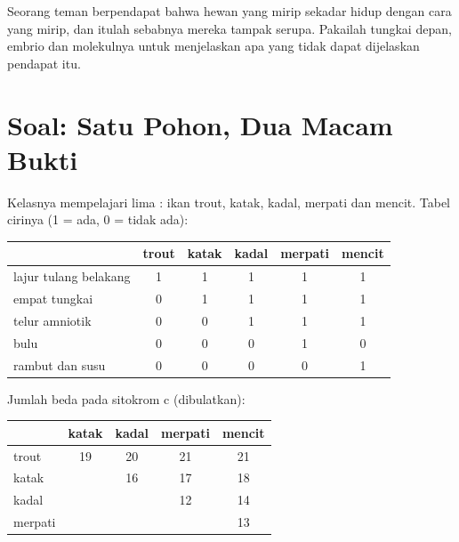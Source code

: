 \begin{exercise}[$\star\star\star$]\label{exo:g10:common-ancestry:15}
Seorang teman berpendapat bahwa hewan yang mirip sekadar hidup dengan
cara yang mirip, dan itulah sebabnya mereka tampak serupa. Pakailah
tungkai depan, embrio dan molekulnya untuk menjelaskan apa yang tidak
dapat dijelaskan pendapat itu.
\end{exercise}

\section{Soal: Satu Pohon, Dua Macam Bukti}

\begin{problem}
\label{pb:g10:common-ancestry:1}
Kelasnya mempelajari lima : ikan trout, katak, kadal, merpati
dan mencit. Tabel cirinya (1 = ada, 0 = tidak ada):

\begin{center}
\begin{tabular}{lccccc}
 & trout & katak & kadal & merpati & mencit \\ \hline
lajur tulang belakang & 1 & 1 & 1 & 1 & 1 \\
empat tungkai & 0 & 1 & 1 & 1 & 1 \\
telur amniotik & 0 & 0 & 1 & 1 & 1 \\
bulu & 0 & 0 & 0 & 1 & 0 \\
rambut dan susu & 0 & 0 & 0 & 0 & 1 \\
\end{tabular}
\end{center}

Jumlah beda pada sitokrom c (dibulatkan):

\begin{center}
\begin{tabular}{lcccc}
 & katak & kadal & merpati & mencit \\ \hline
trout & 19 & 20 & 21 & 21 \\
katak & & 16 & 17 & 18 \\
kadal & & & 12 & 14 \\
merpati & & & & 13 \\
\end{tabular}
\end{center}


\end{problem}
